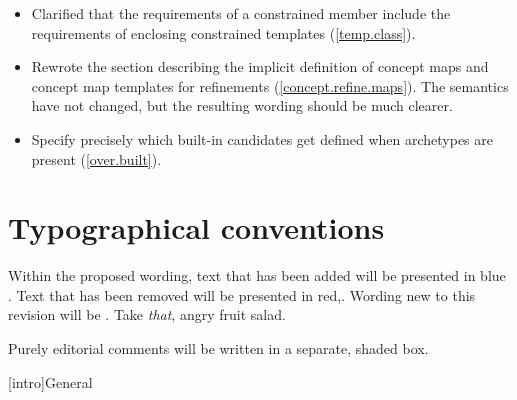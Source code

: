 \documentclass[american]{book}
\newcommand{\editorial}[1]{\colorbox{editbackground}{\begin{minipage}{\linewidth
}#1\end{minipage}}}
\begin{document}
\begin{titlepage}
\begin{itemize}
\item Clarified that the requirements of a constrained member include
  the requirements of enclosing constrained templates
  (\ref{temp.class}).

\item Rewrote the section describing the implicit definition of
  concept maps and concept map templates for refinements
  (\ref{concept.refine.maps}). The semantics have not changed, but the
  resulting wording should be much clearer.

\item Specify precisely which built-in candidates get defined when
  archetypes are present (\ref{over.built}).
\end{itemize}

\section*{Typographical conventions}
Within the proposed wording, text that has been added
\textcolor{addclr}{will be presented in blue} . Text that has been removed will be
presented \textcolor{remclr}{in red},. Wording new to this revision will be 
. Take \emph{that}, angry fruit salad.

\editorial{Purely editorial comments will be written in a separate,
  shaded box.}
\end{titlepage}

\pagestyle{fancy}
\fancyhead[LE,RO]{\textbf{\rightmark}}
\fancyhead[RE]{\textbf{\leftmark\hspace{1em}\thepage}}
\fancyhead[LO]{\textbf{\thepage\hspace{1em}\leftmark}}


\renewcommand{\sectionmark}[1]{\markright{\thesection\hspace{1em}#1}}
\renewcommand{\chaptermark}[1]{\markboth{#1}{}}

[intro]{General}
\end{document}
